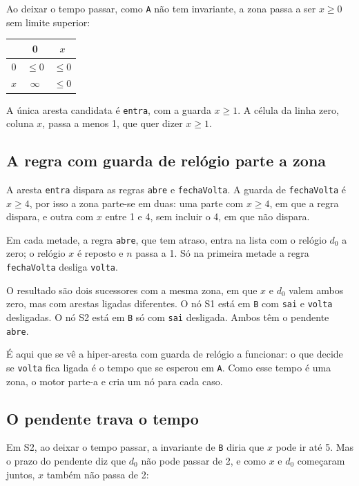 \documentclass[11pt,a4paper]{article}
\newcommand{\code}[1]{\texttt{#1}}
\begin{document}
Ao deixar o tempo passar, como \code{A} não tem invariante, a zona passa a ser \(x \geq 0\) sem limite superior:

\begin{center}
\begin{tabular}{c|cc}
 & 0 & \(x\) \\ \hline
0 & \(\leq 0\) & \(\leq 0\) \\
\(x\) & \(\infty\) & \(\leq 0\)
\end{tabular}
\end{center}

A única aresta candidata é \code{entra}, com a guarda \(x \geq 1\). A célula da linha zero, coluna \(x\), passa a menos 1, que quer dizer \(x \geq 1\).

\subsection{A regra com guarda de relógio parte a zona}

A aresta \code{entra} dispara as regras \code{abre} e \code{fechaVolta}. A guarda de \code{fechaVolta} é \(x \geq 4\), por isso a zona parte-se em duas: uma parte com \(x \geq 4\), em que a regra dispara, e outra com \(x\) entre 1 e 4, sem incluir o 4, em que não dispara.

Em cada metade, a regra \code{abre}, que tem atraso, entra na lista com o relógio \(d_0\) a zero; o relógio \(x\) é reposto e \(n\) passa a 1. Só na primeira metade a regra \code{fechaVolta} desliga \code{volta}.

O resultado são dois sucessores com a mesma zona, em que \(x\) e \(d_0\) valem ambos zero, mas com arestas ligadas diferentes. O nó S1 está em \code{B} com \code{sai} e \code{volta} desligadas. O nó S2 está em \code{B} só com \code{sai} desligada. Ambos têm o pendente \code{abre}.

É aqui que se vê a hiper-aresta com guarda de relógio a funcionar: o que decide se \code{volta} fica ligada é o tempo que se esperou em \code{A}. Como esse tempo é uma zona, o motor parte-a e cria um nó para cada caso.

\subsection{O pendente trava o tempo}

Em S2, ao deixar o tempo passar, a invariante de \code{B} diria que \(x\) pode ir até 5. Mas o prazo do pendente diz que \(d_0\) não pode passar de 2, e como \(x\) e \(d_0\) começaram juntos, \(x\) também não passa de 2:
\end{document}
